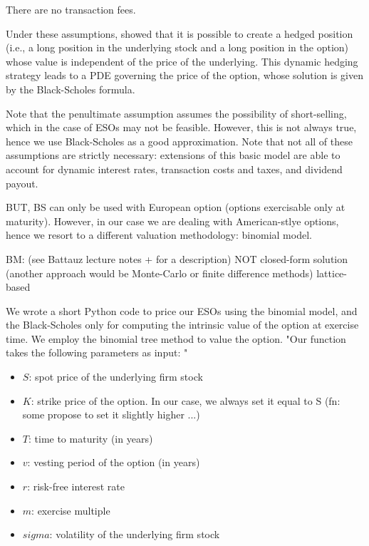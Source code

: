     \begin{assumption}
        There are no transaction fees.
    \end{assumption}
    
    Under these assumptions, \cite{black1973pricing} showed that it is possible to create a hedged position (i.e., a long position in the underlying stock and a long position in the option) whose value is independent of the price of the underlying. This dynamic hedging strategy leads to a PDE governing the price of the option, whose solution is given by the Black-Scholes formula.

    Note that the penultimate assumption assumes the possibility of short-selling, which in the case of ESOs may not be feasible. However, this is not always true, hence we use Black-Scholes as a good approximation. Note that not all of these assumptions are strictly necessary: extensions of this basic model are able to account for dynamic interest rates, transaction costs and taxes, and dividend payout.  


    BUT, BS can only be used with European option (options exercisable only at maturity). However, in our case we are dealing with American-stlye options, hence we resort to a different valuation methodology: binomial model.

BM: (see Battauz lecture notes + \cite{cox1979option} for a description)
    NOT closed-form solution (another approach would be Monte-Carlo or finite difference methods)
    lattice-based 


We wrote a short Python code to price our ESOs using the binomial model, and the Black-Scholes only for computing the intrinsic value of the option at exercise time. We employ the \cite{cox1979option} binomial tree method to value the option.
"Our function takes the following parameters as input: "
\begin{itemize}
    \item $S$: spot price of the underlying firm stock
    \item $K$: strike price of the option. In our case, we always set it equal to S (fn: some propose to set it slightly higher ...)
    \item $T$: time to maturity (in years)
    \item $v$: vesting period of the option (in years)
    \item $r$: risk-free interest rate
    \item $m$: exercise multiple
    \item $sigma$: volatility of the underlying firm stock
\end{itemize}
    
